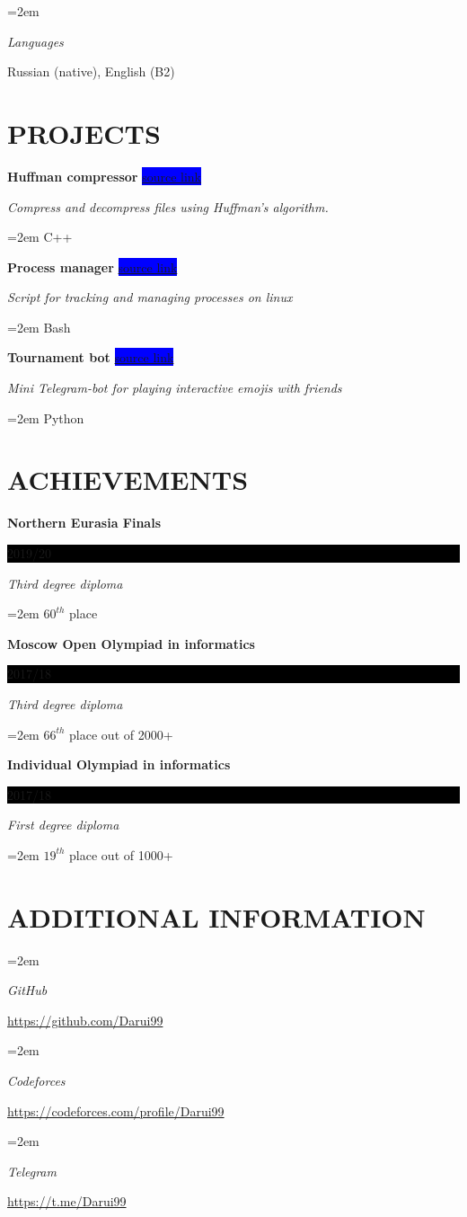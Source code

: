 \documentclass[paper=a4,fontsize=11pt]{scrartcl} %
\newlength{\spacebox}
\newcommand{\sepspace}{\vspace*{1em}}		%
\newcommand{\NewPart}[1]{\section*{\uppercase{#1}}}
\newcommand{\PersonalEntry}[2]{
		\noindent\hangindent=2em\hangafter=0 %
		\parbox{\spacebox}{        %
		\textit{#1}}		       %
		\hspace{1.5em} #2 \par}    %
\newcommand{\SkillsEntry}[2]{      %
		\noindent\hangindent=2em\hangafter=0 %
		\parbox{\spacebox}{        %
		\textit{#1}}			   %
		\hspace{1.5em} #2 \par}    %
\newcommand{\EducationEntry}[4]{
		\noindent \textbf{#1} \hfill      %
		\colorbox{Black}{%
			\parbox{6em}{%
			\hfill\color{White}#2}} \par  %
		\noindent \textit{#3} \par        %
		\noindent\hangindent=2em\hangafter=0 \small #4 %
		\normalsize \par}
\newcommand{\WorkEntry}[4]{				  %
		\noindent \textbf{#1} \hfill      %
		\colorbox{Blue}{\color{White}#2} \par  %
		\noindent \textit{#3} \par              %
		\noindent\hangindent=2em\hangafter=0 \small #4 %
		\normalsize \par}
\begin{document}
\SkillsEntry{Languages}{Russian (native), English (B2)}
\sepspace

\NewPart{Projects}{}

\WorkEntry{Huffman compressor}{\href{https://github.com/Darui99/ITMO-CPP/tree/master/Huffman}{source link}}{Compress and decompress files using Huffman's algorithm.}{C++}
\sepspace

\WorkEntry{Process manager}{\href{https://github.com/Darui99/ITMO-OS/tree/master/HW4 (alternative)}{source link}}{Script for tracking and managing processes on linux}{Bash}
\sepspace

\WorkEntry{Tournament bot}{\href{https://github.com/Alexvsalexvsalex/telegram-game-bot}{source link}}{Mini Telegram-bot for playing interactive emojis with friends}{Python}
\sepspace

\NewPart{Achievements}{}

\EducationEntry{Northern Eurasia Finals}{2019/20}{Third degree diploma}{$60^{th}$ place}
\sepspace

\EducationEntry{Moscow Open Olympiad in informatics}{2017/18}{Third degree diploma}{$66^{th}$ place out of 2000+}
\sepspace

\EducationEntry{Individual Olympiad in informatics}{2017/18}{First degree diploma}{$19^{th}$ place out of 1000+}
\sepspace

\NewPart{Additional information}{}

\SkillsEntry{GitHub}{\href{https://github.com/Darui99}{https://github.com/Darui99} }
\sepspace

\SkillsEntry{Codeforces}{\href{https://codeforces.com/profile/Darui99}{https://codeforces.com/profile/Darui99} }
\sepspace

\SkillsEntry{Telegram}{\href{https://t.me/Darui99}{https://t.me/Darui99} }
\end{document}
